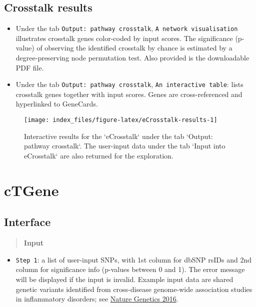 \documentclass[
  oneside]{book}
\providecommand{\tightlist}{%
  \setlength{\itemsep}{0pt}\setlength{\parskip}{0pt}}
\begin{document}
\hypertarget{crosstalk-results}{%
\section{Crosstalk results}\label{crosstalk-results}}

\begin{itemize}
\item
  Under the tab \texttt{Output:\ pathway\ crosstalk}, \texttt{A\ network\ visualisation} illustrates crosstalk genes color-coded by input scores. The significance (p-value) of observing the identified crosstalk by chance is estimated by a degree-preserving node permutation test. Also provided is the downloadable PDF file.
\item
  Under the tab \texttt{Output:\ pathway\ crosstalk}, \texttt{An\ interactive\ table}: lists crosstalk genes together with input scores. Genes are cross-referenced and hyperlinked to GeneCards.
\end{itemize}

\begin{figure}

{\centering \texttt{[image: index\_files/figure-latex/eCrosstalk-results-1]} 

}

\caption{Interactive results for the `eCrosstalk` under the tab `Output: pathway crosstalk`. The user-input data under the tab `Input into eCrosstalk` are also returned for the exploration.}\label{fig:eCrosstalk-results}
\end{figure}

\hypertarget{ctgene}{%
\chapter{cTGene}\label{ctgene}}

\hypertarget{interface-3}{%
\section{Interface}\label{interface-3}}

\begin{quote}
\textbf{Input}
\end{quote}

\begin{itemize}
\tightlist
\item
  \texttt{Step\ 1}: a list of user-input SNPs, with 1st column for dbSNP rsIDs and 2nd column for significance info (p-values between 0 and 1). The error message will be displayed if the input is invalid. Example input data are shared genetic variants identified from cross-disease genome-wide association studies in inflammatory disorders; see \href{https://www.ncbi.nlm.nih.gov/pubmed/26974007}{Nature Genetics 2016}.
\end{itemize}
\end{document}
